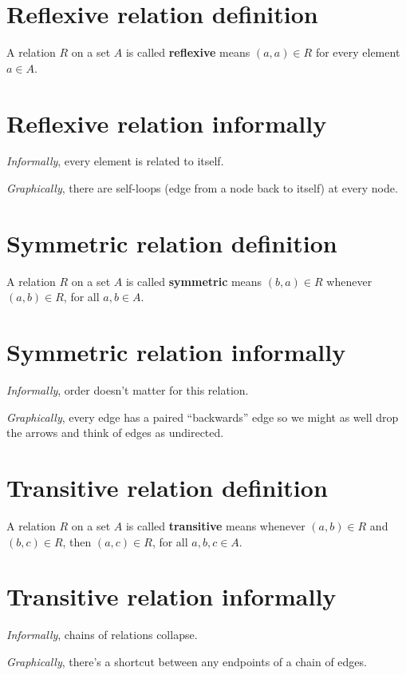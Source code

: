 \documentclass[12pt, oneside]{article}
\begin{document}
\begin{flushright}
\end{flushright} \section*{Reflexive relation definition}


A relation $R$ on a set $A$ is called {\bf reflexive} 
means $(a, a) \in R$ for every element $a \in A$. 
 \vfill
\section*{Reflexive relation informally}


{\it Informally}, every element is related to itself.

{\it Graphically}, there are self-loops (edge from a node back to itself) at 
every node. \vfill
\section*{Symmetric relation definition}


A relation $R$ on a set $A$ is called {\bf symmetric} means 
$(b, a) \in R$ whenever $(a, b) \in R$, for all $a, b \in A$. 
 \vfill
\section*{Symmetric relation informally}


{\it Informally}, order doesn't matter for this relation.

{\it Graphically}, every edge has a paired ``backwards'' edge so we might
as well drop the arrows and think of edges as undirected. \vfill
\section*{Transitive relation definition}


A relation $R$ on a set $A$ is called {\bf transitive} means 
whenever $(a, b) \in R$ and $(b, c) \in R$, then $(a, c) \in R$, for all $a, b, c \in A$.
 \vfill
\section*{Transitive relation informally}


{\it Informally}, chains of relations collapse.

{\it Graphically}, there's a shortcut between any endpoints of a chain of 
edges. \vfill
\end{document}
